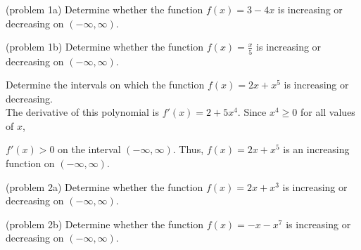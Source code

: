 \documentclass[handout]{ximera}
\begin{document}
\begin{problem}(problem 1a)
Determine whether the function $f(x) = 3 - 4x$ is increasing or decreasing on $(-\infty, \infty)$.\\
\begin{multipleChoice}
\end{multipleChoice}
\end{problem}

\begin{problem}(problem 1b)
Determine whether the function $f(x) = \frac{x}{5}$ is increasing or 
decreasing on $(-\infty, \infty)$.\\
\begin{multipleChoice}
\end{multipleChoice}
\end{problem}


\begin{example}[example 2]
Determine the intervals on which the function $f(x) = 2x + x^5$ is increasing or decreasing.\\
The derivative of this polynomial is $f'(x) = 2 + 5x^4$. Since $x^4 \geq 0$ for all values of $x$, 

$f'(x) > 0$ on the interval $(-\infty, \infty)$. Thus, $f(x) = 2x + x^5$ is an increasing 
function on $(-\infty, \infty)$.

\end{example}

\begin{problem}(problem 2a)
Determine whether the function $f(x) = 2x + x^3$ is increasing or 
decreasing on $(-\infty, \infty)$.\\
\begin{multipleChoice}
\end{multipleChoice}
\end{problem}

\begin{problem}(problem 2b)
Determine whether the function $f(x) = -x - x^7$ is increasing or 
decreasing on $(-\infty, \infty)$.\\
\begin{multipleChoice}
\end{multipleChoice}
\end{problem}
\end{document}
